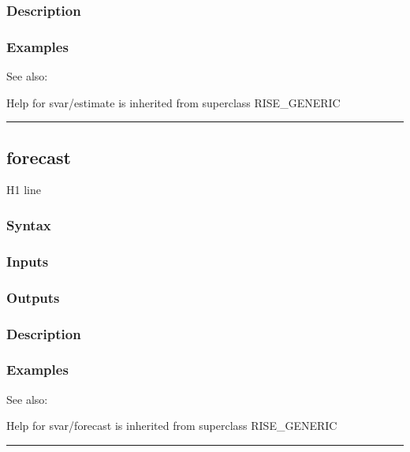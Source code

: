 \documentclass[letterpaper,10pt,english]{sphinxmanual}
\begin{document}
\subsubsection{Description}
\label{classes/models/@svar/svar:id12}

\subsubsection{Examples}
\label{classes/models/@svar/svar:id13}
See also:

Help for svar/estimate is inherited from superclass RISE\_GENERIC


\bigskip\hrule{}\bigskip



\subsection{forecast}
\label{classes/models/@svar/svar:id14}\label{classes/models/@svar/svar:forecast}
H1 line


\subsubsection{Syntax}
\label{classes/models/@svar/svar:id15}

\subsubsection{Inputs}
\label{classes/models/@svar/svar:id16}

\subsubsection{Outputs}
\label{classes/models/@svar/svar:id17}

\subsubsection{Description}
\label{classes/models/@svar/svar:id18}

\subsubsection{Examples}
\label{classes/models/@svar/svar:id19}
See also:

Help for svar/forecast is inherited from superclass RISE\_GENERIC


\bigskip\hrule{}\bigskip
\end{document}
